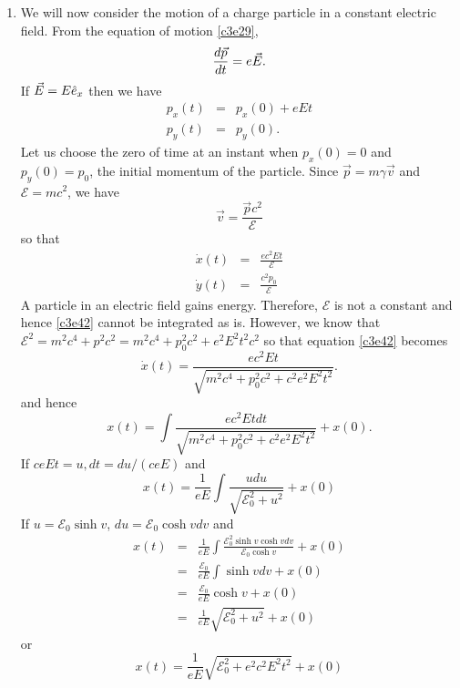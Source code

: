 \begin{enumerate}
\item We will now consider the motion of a charge particle in a constant electric
field. From the equation of motion \eqref{c3e29},
\begin{equation}\label{c3e38}
\frac{d{\vec{p}}}{d{t}} = e\vec{E}.
\end{equation}
If $\vec{E} = E\hat{e}_{x}$ then we have
\begin{eqnarray}
p_x(t) &=& p_x(0) + eEt \label{c3e39} \\
p_y(t) &=& p_y(0) \label{c3e40}.
\end{eqnarray}
Let us choose the zero of time at an instant when $p_x(0) = 0$ and $p_y(0) = p_0$,
the initial momentum of the particle. Since $\vec{p} = m\gamma\vec{v}$ and 
$\mathcal{E} = mc^2$, we have 
\begin{equation}\label{c3e41}
\vec{v} = \frac{\vec{p}c^2}{\mathcal{E}}
\end{equation}
so that
\begin{eqnarray}
\dot{x}(t) &=& \frac{ec^2Et}{\mathcal{E}} \label{c3e42} \\
\dot{y}(t) &=& \frac{c^2p_0}{\mathcal{E}} \label{c3e43}
\end{eqnarray}
A particle in an electric field gains energy. Therefore, $\mathcal{E}$ is not a
constant and hence \eqref{c3e42} cannot be integrated as is. However, we know 
that $\mathcal{E}^2 = m^2c^4 + p^2c^2 = m^2c^4 + p_0^2c^2 + e^2E^2t^2c^2$ so that
equation \eqref{c3e42} becomes
\begin{equation}\label{c3e44}
\dot{x}(t) = \frac{ec^2Et}{\sqrt{m^2c^4 + p_0^2c^2 + c^2e^2E^2t^2}}.
\end{equation}
and hence
\[
x(t) = \int \frac{ec^2Et dt}{\sqrt{m^2c^4 + p_0^2c^2 + c^2e^2E^2t^2}} + x(0).
\]
If $ceEt = u, dt = du/(ceE)$ and
\[
x(t) = \frac{1}{eE}\int\frac{u du}{\sqrt{\mathcal{E}_0^2 + u^2}} + x(0)
\]
If $u = \mathcal{E}_0\sinh v$, $du = \mathcal{E}_0\cosh  vdv$ and
\begin{eqnarray*}
x(t) &=& \frac{1}{eE}\int\frac{\mathcal{E}_0^2\sinh v\cosh v dv}{\mathcal{E}_0\cosh v} + x(0) \\
 &=& \frac{\mathcal{E}_0}{eE}\int\sinh v dv + x(0) \\
 &=& \frac{\mathcal{E}_0}{eE}\cosh v + x(0) \\
 &=& \frac{1}{eE}\sqrt{\mathcal{E}_0^2 + u^2} + x(0)
\end{eqnarray*}
or
\begin{equation}\label{c3e45}
x(t) = \frac{1}{eE}\sqrt{\mathcal{E}_0^2 + e^2c^2E^2t^2} + x(0)
\end{equation}

\end{enumerate}
